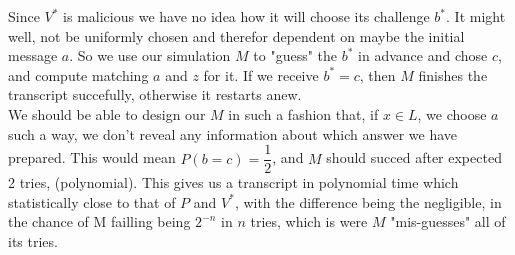\documentclass[paper=a4, fontsize=11pt]{scrartcl} %
\numberwithin{equation}{section} %
\numberwithin{figure}{section} %
\numberwithin{table}{section} %
\begin{document}
	Since $V^*$ is malicious we have no idea how it will choose its challenge $b^*$. It might well, not be uniformly chosen and therefor dependent on maybe the initial message $a$. So we use our simulation $M$ to "guess" the $b^*$ in advance and chose $c$, and compute matching $a$ and $z$ for it. If we receive $b^*=c$, then $M$ finishes the transcript succefully, otherwise it restarts anew. \\
	
	We should be able to design our $M$ in such a fashion that, if $x\in L$, we choose $a$ such a way, we don't reveal any information about which answer we have prepared. This would mean $P(b=c)=\dfrac{1}{2}$, and $M$ should succed after expected 2 tries, (polynomial). This gives us a transcript in polynomial time which statistically close to that of $P$ and $V^*$, with the difference being the negligible, in the chance of M failling being $2^{-n}$ in $n$ tries, which is were $M$ "mis-guesses" all of its tries. 


    
\end{document}
